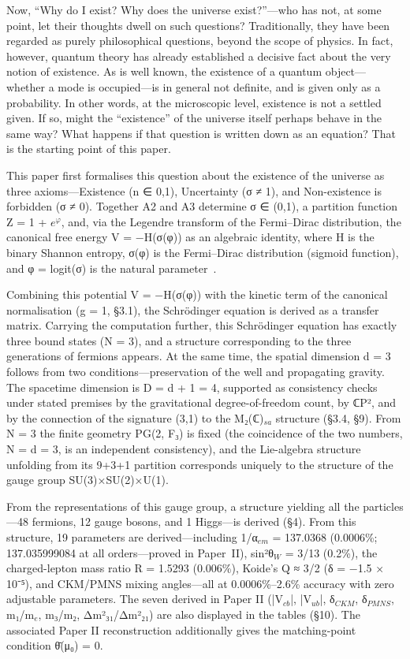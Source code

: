 \documentclass[12pt,a4paper]{article}
\begin{document}
Now, ``Why do I exist? Why does the universe exist?''---who has not, at some point, let their thoughts dwell on such questions? Traditionally, they have been regarded as purely philosophical questions, beyond the scope of physics. In fact, however, quantum theory has already established a decisive fact about the very notion of existence. As is well known, the existence of a quantum object---whether a mode is occupied---is in general not definite, and is given only as a probability. In other words, at the microscopic level, existence is not a settled given. If so, might the ``existence'' of the universe itself perhaps behave in the same way? What happens if that question is written down as an equation? That is the starting point of this paper.

This paper first formalises this question about the existence of the universe as three axioms---Existence (n ∈ {0,1}), Uncertainty (σ ≠ 1), and Non-existence is forbidden (σ ≠ 0). Together A2 and A3 determine σ ∈ (0,1), a partition function Z = 1 + $e^\varphi$, and, via the Legendre transform of the Fermi–Dirac distribution, the canonical free energy V = −H(σ(φ)) as an algebraic identity, where H is the binary Shannon entropy, σ(φ) is the Fermi–Dirac distribution (sigmoid function), and φ = logit(σ) is the natural parameter~\cite{amari,ay}.

Combining this potential V = −H(σ(φ)) with the kinetic term of the canonical normalisation (g = 1, §3.1), the Schr\"odinger equation is derived as a transfer matrix. Carrying the computation further, this Schr\"odinger equation has exactly three bound states (N = 3), and a structure corresponding to the three generations of fermions appears. At the same time, the spatial dimension d = 3 follows from two conditions---preservation of the well and propagating gravity. The spacetime dimension is D = d + 1 = 4, supported as consistency checks under stated premises by the gravitational degree-of-freedom count, by ℂP², and by the connection of the signature (3,1) to the M₂(ℂ)$_{sa}$ structure (§3.4, §9). From N = 3 the finite geometry PG(2, F₃) is fixed (the coincidence of the two numbers, N = d = 3, is an independent consistency), and the Lie-algebra structure unfolding from its 9+3+1 partition corresponds uniquely to the structure of the gauge group SU(3)×SU(2)×U(1).

From the representations of this gauge group, a structure yielding all the particles---48 fermions, 12 gauge bosons, and 1 Higgs---is derived (§4). From this structure, 19 parameters are derived---including 1/α$_{em}$ = 137.0368 (0.0006\%; 137.035999084 at all orders---proved in Paper~II), sin²θ$_W$ = 3/13 (0.2\%), the charged-lepton mass ratio R = 1.5293 (0.006\%), Koide's Q ≈ 3/2 (δ = −1.5 × 10⁻⁵), and CKM/PMNS mixing angles---all at 0.0006\%–2.6\% accuracy with zero adjustable parameters. The seven derived in Paper II (|V$_{cb}$|, |V$_{ub}$|, δ$_{CKM}$, δ$_{PMNS}$, m₁/m$_e$, m₃/m₂, Δm²₃₁/Δm²₂₁) are also displayed in the tables (§10). The associated Paper II reconstruction additionally gives the matching-point condition θ̄(μ₀) = 0.
\end{document}
